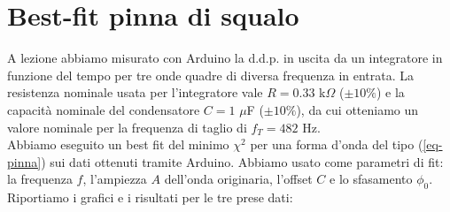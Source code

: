 \documentclass{article}[a4paper, oneside,11pt]
\begin{document}
\section{Best-fit pinna di squalo}
    \noindent A lezione abbiamo misurato con Arduino la d.d.p. in uscita da un integratore in funzione del tempo per tre onde quadre di diversa frequenza in entrata. La resistenza nominale usata per l'integratore vale $R=0.33$ k$\Omega$ ($\pm 10\%$) e la capacità nominale del condensatore $C=1$ $\mu$F ($\pm 10\%$), da cui otteniamo un valore nominale per la frequenza di taglio di $f_T=482$ Hz.\\
    Abbiamo eseguito un best fit del minimo $\chi^2$ per una forma d'onda del tipo (\ref{eq-pinna}) sui dati ottenuti tramite Arduino. Abbiamo usato come parametri di fit: la frequenza $f$, l'ampiezza $A$ dell'onda originaria, l'offset $C$ e lo sfasamento $\phi_0$. Riportiamo i grafici e i risultati per le tre prese dati:
    
\end{document}
